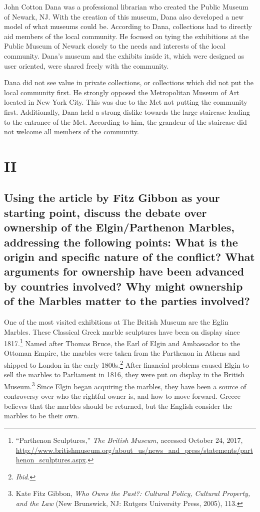 \documentclass[11pt]{article}
\begin{document}
\doublespacing
John Cotton Dana was a professional librarian who created the Public Museum of Newark, NJ. With the creation of this museum, Dana also developed a new model of what museums could be. According to Dana, collections had to directly aid members of the local community. He focused on tying the exhibitions at the Public Museum of Newark closely to the needs and interests of the local community. Dana's museum and the exhibits inside it, which were designed as user oriented, were shared freely with the community.

Dana did not see value in private collections, or collections which did not put the local community first. He strongly opposed the Metropolitan Museum of Art located in New York City. This was due to the Met not putting the community first. Additionally, Dana held a strong dislike towards the large staircase leading to the entrance of the Met. According to him, the grandeur of the staircase did not welcome all members of the community.

\section*{II}
\singlespacing
\subsection*{Using the article by Fitz Gibbon as your starting point, discuss the debate over ownership of the Elgin/Parthenon Marbles, addressing the following points: What is the origin and specific nature of the conflict? What arguments for ownership have been advanced by countries involved? Why might ownership of the Marbles matter to the parties involved?}

\doublespacing
One of the most visited exhibitions at The British Museum are the Eglin Marbles. These Classical Greek marble sculptures have been on display since 1817.\footnote{``Parthenon Sculptures,'' \textit{The British Museum,} accessed October 24, 2017, \url{http://www.britishmuseum.org/about_us/news_and_press/statements/parthenon_sculptures.aspx}.} Named after Thomas Bruce, the Earl of Elgin and Ambassador to the Ottoman Empire, the marbles were taken from the Parthenon in Athens and shipped to London in the early 1800s.\footnote{\textit{Ibid.}} After financial problems caused Elgin to sell the marbles to Parliament in 1816, they were put on display in the British Museum.\footnote{Kate Fitz Gibbon, \textit{Who Owns the Past?: Cultural Policy, Cultural Property, and the Law} (New Brunswick, NJ: Rutgers University Press, 2005), 113.} Since Elgin began acquiring the marbles, they have been a source of controversy over who the rightful owner is, and how to move forward. Greece believes that the marbles should be returned, but the English consider the marbles to be their own.
\end{document}
